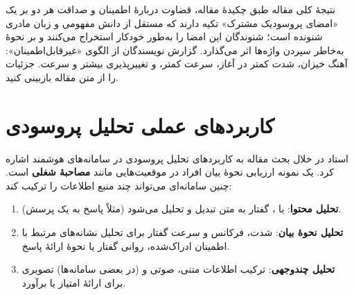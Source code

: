 \begin{addedbox}{نتیجهٔ کلی مقاله}
طبق چکیدهٔ مقاله، قضاوت دربارهٔ اطمینان و صداقت هر دو بر یک «امضای پروسودیک مشترک» تکیه دارند که مستقل از دانش مفهومی و زبان مادری شنونده است؛ شنوندگان این امضا را به‌طور خودکار استخراج می‌کنند و بر نحوهٔ به‌خاطر سپردن واژه‌ها اثر می‌گذارد. گزارش نویسندگان از الگوی «غیرقابل‌اطمینان»: آهنگ خیزان، شدت کمتر در آغاز، سرعت کمتر، و تغییرپذیری بیشتر  و سرعت. جزئیات را از متن مقاله بازبینی کنید.
\end{addedbox}

\section{کاربردهای عملی تحلیل پروسودی}

استاد در خلال بحث مقاله به کاربردهای تحلیل پروسودی در سامانه‌های هوشمند اشاره کرد. یک نمونه ارزیابی نحوهٔ بیان افراد در موقعیت‌هایی مانند \textbf{مصاحبهٔ شغلی} است. چنین سامانه‌ای می‌تواند چند منبع اطلاعات را ترکیب کند:
\begin{enumerate}
  \item \textbf{تحلیل محتوا}: با ، گفتار به متن تبدیل و تحلیل می‌شود (مثلاً پاسخ به یک پرسش).
  \item \textbf{تحلیل نحوهٔ بیان}: شدت، فرکانس و سرعت گفتار برای تحلیل نشانه‌های مرتبط با اطمینان ادراک‌شده، روانی گفتار یا نحوهٔ ارائهٔ پاسخ.
  \item \textbf{تحلیل چندوجهی}: ترکیب اطلاعات متنی، صوتی و (در بعضی سامانه‌ها) تصویری برای ارائهٔ امتیاز یا برآورد.
\end{enumerate}

\begin{center}
\end{center}


